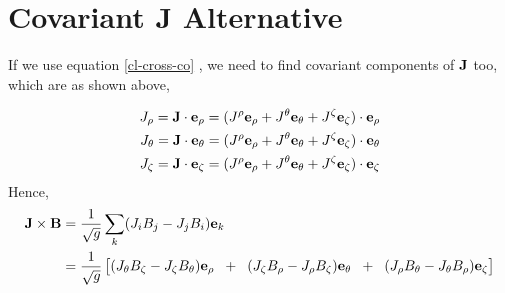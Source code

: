 \section{Covariant J Alternative}\label{appendix-1}
If we use equation \ref{cl-cross-co} , we need to find covariant components of $\mathbf{J}$ too, which are as shown above,

\begin{align}
    J_\rho = \mathbf{J} \cdot \mathbf{e}_\rho = (J^\rho \mathbf{e}_\rho + J^\theta \mathbf{e}_\theta + J^\zeta \mathbf{e}_\zeta) \cdot \mathbf{e}_\rho \\
    J_\theta = \mathbf{J} \cdot \mathbf{e}_\theta = (J^\rho \mathbf{e}_\rho + J^\theta \mathbf{e}_\theta + J^\zeta \mathbf{e}_\zeta) \cdot \mathbf{e}_\theta \\
    J_\zeta = \mathbf{J} \cdot \mathbf{e}_\zeta = (J^\rho \mathbf{e}_\rho + J^\theta \mathbf{e}_\theta + J^\zeta \mathbf{e}_\zeta) \cdot \mathbf{e}_\zeta
\end{align}
Hence,
\begin{align}
    \mathbf{J} \times \mathbf{B} &= \frac{1}{\sqrt{g}} \sum_k (J_i B_j - J_j B_i)\mathbf{e}_k \\
    &= \frac{1}{\sqrt{g}} \begin{bmatrix}
        (J_\theta B_\zeta - J_\zeta B_\theta)\mathbf{e}_\rho  \hspace{.2cm}+\hspace{.2cm}
        (J_\zeta B_\rho - J_\rho B_\zeta)\mathbf{e}_\theta    \hspace{.2cm}+\hspace{.2cm}
        (J_\rho B_\theta - J_\theta B_\rho)\mathbf{e}_\zeta
    \end{bmatrix}
\end{align}